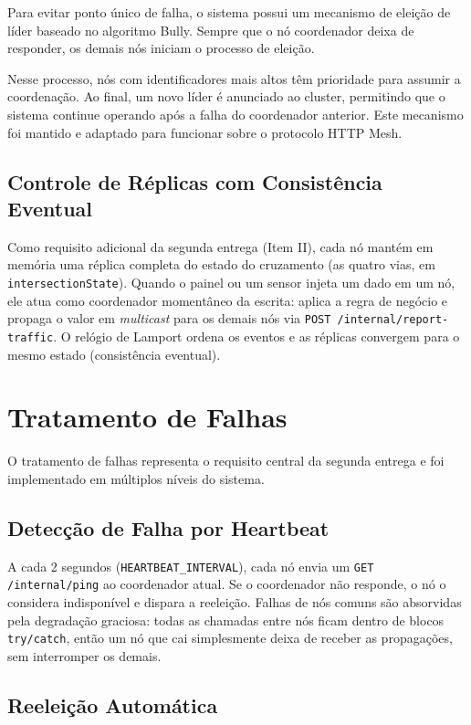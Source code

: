 \documentclass[12pt]{article}
\begin{document}
Para evitar ponto único de falha, o sistema possui um mecanismo de eleição de líder baseado no algoritmo Bully. Sempre que o nó coordenador deixa de responder, os demais nós iniciam o processo de eleição.

Nesse processo, nós com identificadores mais altos têm prioridade para assumir a coordenação. Ao final, um novo líder é anunciado ao cluster, permitindo que o sistema continue operando após a falha do coordenador anterior. Este mecanismo foi mantido e adaptado para funcionar sobre o protocolo HTTP Mesh.

\subsection{Controle de Réplicas com Consistência Eventual}

Como requisito adicional da segunda entrega (Item II), cada nó mantém em memória uma réplica completa do estado do cruzamento (as quatro vias, em \texttt{intersectionState}). Quando o painel ou um sensor injeta um dado em um nó, ele atua como coordenador momentâneo da escrita: aplica a regra de negócio e propaga o valor em \textit{multicast} para os demais nós via \texttt{POST /internal/report-traffic}. O relógio de Lamport ordena os eventos e as réplicas convergem para o mesmo estado (consistência eventual).

\section{Tratamento de Falhas}

O tratamento de falhas representa o requisito central da segunda entrega e foi implementado em múltiplos níveis do sistema.

\subsection{Detecção de Falha por Heartbeat}

A cada 2 segundos (\texttt{HEARTBEAT\_INTERVAL}), cada nó envia um \texttt{GET /internal/ping} ao coordenador atual. Se o coordenador não responde, o nó o considera indisponível e dispara a reeleição. Falhas de nós comuns são absorvidas pela degradação graciosa: todas as chamadas entre nós ficam dentro de blocos \texttt{try/catch}, então um nó que cai simplesmente deixa de receber as propagações, sem interromper os demais.

\subsection{Reeleição Automática}
\end{document}
